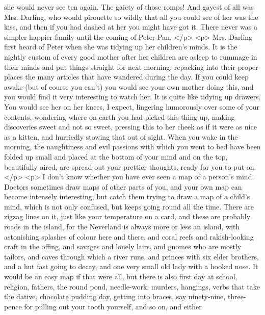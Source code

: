       she would never see ten again. The gaiety of those romps! And gayest of
      all was Mrs. Darling, who would pirouette so wildly that all you could see
      of her was the kiss, and then if you had dashed at her you might have got
      it. There never was a simpler happier family until the coming of Peter
      Pan.
    </p>
    <p>
      Mrs. Darling first heard of Peter when she was tidying up her children's
      minds. It is the nightly custom of every good mother after her children
      are asleep to rummage in their minds and put things straight for next
      morning, repacking into their proper places the many articles that have
      wandered during the day. If you could keep awake (but of course you can't)
      you would see your own mother doing this, and you would find it very
      interesting to watch her. It is quite like tidying up drawers. You would
      see her on her knees, I expect, lingering humorously over some of your
      contents, wondering where on earth you had picked this thing up, making
      discoveries sweet and not so sweet, pressing this to her cheek as if it
      were as nice as a kitten, and hurriedly stowing that out of sight. When
      you wake in the morning, the naughtiness and evil passions with which you
      went to bed have been folded up small and placed at the bottom of your
      mind and on the top, beautifully aired, are spread out your prettier
      thoughts, ready for you to put on.
    </p>
    <p>
      I don't know whether you have ever seen a map of a person's mind. Doctors
      sometimes draw maps of other parts of you, and your own map can become
      intensely interesting, but catch them trying to draw a map of a child's
      mind, which is not only confused, but keeps going round all the time.
      There are zigzag lines on it, just like your temperature on a card, and
      these are probably roads in the island, for the Neverland is always more
      or less an island, with astonishing splashes of colour here and there, and
      coral reefs and rakish-looking craft in the offing, and savages and lonely
      lairs, and gnomes who are mostly tailors, and caves through which a river
      runs, and princes with six elder brothers, and a hut fast going to decay,
      and one very small old lady with a hooked nose. It would be an easy map if
      that were all, but there is also first day at school, religion, fathers,
      the round pond, needle-work, murders, hangings, verbs that take the
      dative, chocolate pudding day, getting into braces, say ninety-nine,
      three-pence for pulling out your tooth yourself, and so on, and either
